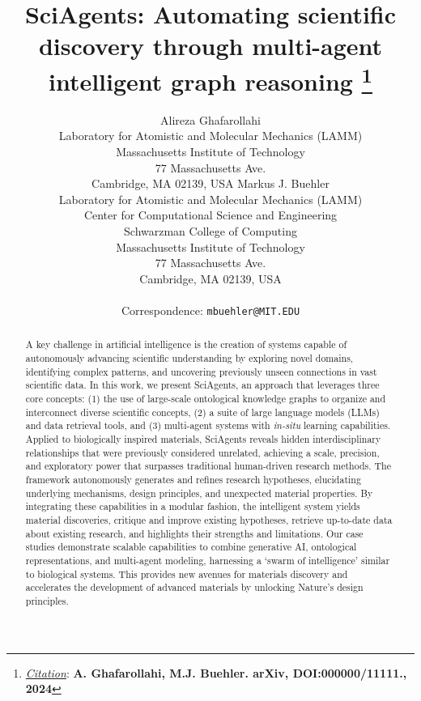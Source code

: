 \documentclass{article}
\title{SciAgents: Automating scientific discovery through multi-agent intelligent graph reasoning
\thanks{\textit{\underline{Citation}}: 
\textbf{A. Ghafarollahi, M.J. Buehler. arXiv, DOI:000000/11111., 2024}} 
}
\author{
  Alireza Ghafarollahi \\
  Laboratory for Atomistic and Molecular Mechanics (LAMM)\\Massachusetts Institute of Technology\\ 77 Massachusetts Ave.\\ Cambridge, MA 02139, USA 
   \And
  Markus J. Buehler \\
  Laboratory for Atomistic and Molecular Mechanics (LAMM)  \\
  Center for Computational Science and Engineering\\ Schwarzman College of Computing\\ Massachusetts Institute of Technology\\77 Massachusetts Ave.\\Cambridge, MA 02139, USA\\ \\
  Correspondence: \texttt{mbuehler@MIT.EDU} \\
}
\begin{document}
\maketitle

\begin{abstract}
A key challenge in artificial intelligence is the creation of systems capable of autonomously advancing scientific understanding by exploring novel domains, identifying complex patterns, and uncovering previously unseen connections in vast scientific data. In this work, we present SciAgents, an approach that leverages three core concepts: (1) the use of large-scale ontological knowledge graphs to organize and interconnect diverse scientific concepts, (2) a suite of large language models (LLMs) and data retrieval tools, and (3) multi-agent systems with \textit{in-situ} learning capabilities. Applied to biologically inspired materials, SciAgents reveals hidden interdisciplinary relationships that were previously considered unrelated, achieving a scale, precision, and exploratory power that surpasses traditional human-driven research methods. The framework autonomously generates and refines research hypotheses, elucidating underlying mechanisms, design principles, and unexpected material properties. By integrating these capabilities in a modular fashion, the intelligent system yields material discoveries, critique and improve existing hypotheses, retrieve up-to-date data about existing research, and highlights their strengths and limitations. Our case studies demonstrate scalable capabilities to combine generative AI, ontological representations, and multi-agent modeling, harnessing a `swarm of intelligence' similar to biological systems. This provides new avenues for materials discovery and accelerates the development of advanced materials by unlocking Nature’s design principles. 
\end{abstract}


\end{document}
